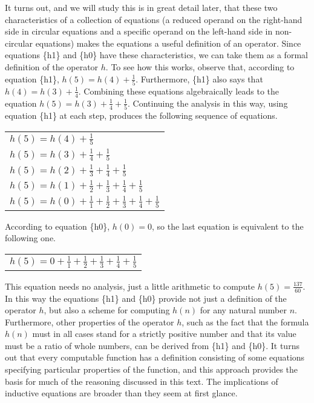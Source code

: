 It turns out, and we will study this is in great detail later,
that these two characteristics of a collection of equations
(a reduced operand on the right-hand side in circular equations
and a specific operand on the left-hand side in non-circular equations)
makes the equations a useful definition of an operator.
Since equations \{h1\} and \{h0\} have these characteristics,
we can take them as a formal definition of the operator $h$.
To see how this works, observe that, according to equation \{h1\},
$h(5) = h(4)+\frac{1}{5}$.
Furthermore, \{h1\} also says that $h(4) = h(3)+\frac{1}{4}$.
Combining these equations algebraically leads to the equation
$h(5) = h(3)+\frac{1}{4}+\frac{1}{5}$.
Continuing the analysis in this way, using equation \{h1\} at each step,
produces the following sequence of equations.
\begin{center}
\begin{tabular}{l}
$h(5) = h(4) + \frac{1}{5}$ \\
$h(5) = h(3) + \frac{1}{4} + \frac{1}{5}$\\
$h(5) = h(2) + \frac{1}{3} + \frac{1}{4} + \frac{1}{5}$\\
$h(5) = h(1) + \frac{1}{2} + \frac{1}{3} + \frac{1}{4} + \frac{1}{5}$\\
$h(5) = h(0) + \frac{1}{1} + \frac{1}{2} + \frac{1}{3} + \frac{1}{4} + \frac{1}{5}$\\
\end{tabular}
\end{center}

According to equation \{h0\}, $h(0) = 0$, 
so the last equation is equivalent to the following one.
\begin{center}
\begin{tabular}{l}
$h(5) = 0 + \frac{1}{1} + \frac{1}{2} + \frac{1}{3} + \frac{1}{4} + \frac{1}{5}$\\
\end{tabular}
\end{center}

This equation needs no analysis, just a little arithmetic
to compute $h(5) = \frac{137}{60}$.
In this way the equations \{h1\} and \{h0\} provide not just
a definition of the operator $h$, but also a scheme for computing $h(n)$
for any natural number $n$.
Furthermore, other properties of the operator $h$,
such as the fact that the formula $h(n)$
must in all cases stand for a strictly positive number
and that its value must be a ratio of whole numbers,
can be derived from \{h1\} and \{h0\}.
It turns out that every computable function has a definition consisting
of some equations specifying particular properties of the function,
and this approach provides the basis for much of the reasoning
discussed in this text.
The implications of inductive equations are broader than they seem at first glance.

